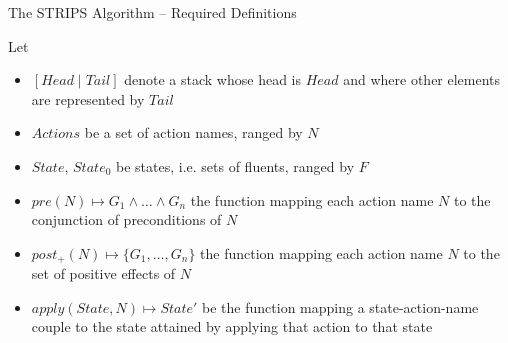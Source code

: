 \documentclass[presentation]{beamer}\mode<presentation>{\usetheme{AMSBolognaFC}}
\begin{document}
\begin{frame}[c]{The STRIPS Algorithm -- Required Definitions}

Let
%
\begin{itemize}
    \item $[ Head \mid Tail ]$ denote a stack whose head is $Head$ and where other elements are represented by $Tail$

    \vfill

    \item $Actions$ be a set of action names, ranged by $N$

    \vfill

    \item $State$, $State_0$ be states, i.e. sets of fluents, ranged by $F$

    \vfill

    \item $pre(N) \mapsto G_1 \wedge \ldots \wedge G_n$ the function mapping each action name $N$ to the conjunction of preconditions of $N$

    \vfill

    \item $post_+(N) \mapsto \{G_1, \ldots, G_n\}$ the function mapping each action name $N$ to the set of positive effects of $N$

    \vfill

    \item $apply(State, N) \mapsto State'$ be the function mapping a state-action-name couple to the state attained by applying that action to that state
\end{itemize}

\end{frame}
\end{document}

